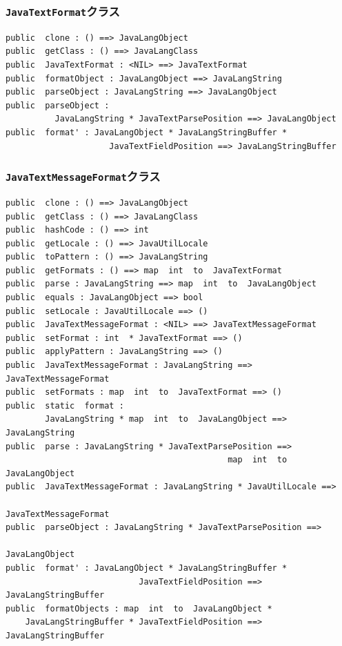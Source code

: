 \documentclass[\pformat,12pt]{jarticle}
\begin{document}
\subsubsection{\texttt{JavaTextFormat}クラス}
\begin{small}
\begin{verbatim}
public  clone : () ==> JavaLangObject
public  getClass : () ==> JavaLangClass
public  JavaTextFormat : <NIL> ==> JavaTextFormat
public  formatObject : JavaLangObject ==> JavaLangString
public  parseObject : JavaLangString ==> JavaLangObject
public  parseObject : 
          JavaLangString * JavaTextParsePosition ==> JavaLangObject
public  format' : JavaLangObject * JavaLangStringBuffer * 
                     JavaTextFieldPosition ==> JavaLangStringBuffer
\end{verbatim}
\end{small}

\subsubsection{\texttt{JavaTextMessageFormat}クラス}
\begin{small}
\begin{verbatim}
public  clone : () ==> JavaLangObject
public  getClass : () ==> JavaLangClass
public  hashCode : () ==> int
public  getLocale : () ==> JavaUtilLocale
public  toPattern : () ==> JavaLangString
public  getFormats : () ==> map  int  to  JavaTextFormat
public  parse : JavaLangString ==> map  int  to  JavaLangObject
public  equals : JavaLangObject ==> bool
public  setLocale : JavaUtilLocale ==> ()
public  JavaTextMessageFormat : <NIL> ==> JavaTextMessageFormat
public  setFormat : int  * JavaTextFormat ==> ()
public  applyPattern : JavaLangString ==> ()
public  JavaTextMessageFormat : JavaLangString ==> JavaTextMessageFormat
public  setFormats : map  int  to  JavaTextFormat ==> ()
public  static  format : 
        JavaLangString * map  int  to  JavaLangObject ==> JavaLangString
public  parse : JavaLangString * JavaTextParsePosition ==> 
                                             map  int  to  JavaLangObject
public  JavaTextMessageFormat : JavaLangString * JavaUtilLocale ==> 
                                                    JavaTextMessageFormat
public  parseObject : JavaLangString * JavaTextParsePosition ==> 
                                                           JavaLangObject
public  format' : JavaLangObject * JavaLangStringBuffer * 
                           JavaTextFieldPosition ==> JavaLangStringBuffer
public  formatObjects : map  int  to  JavaLangObject * 
    JavaLangStringBuffer * JavaTextFieldPosition ==> JavaLangStringBuffer
\end{verbatim}
\end{small}
\end{document}
